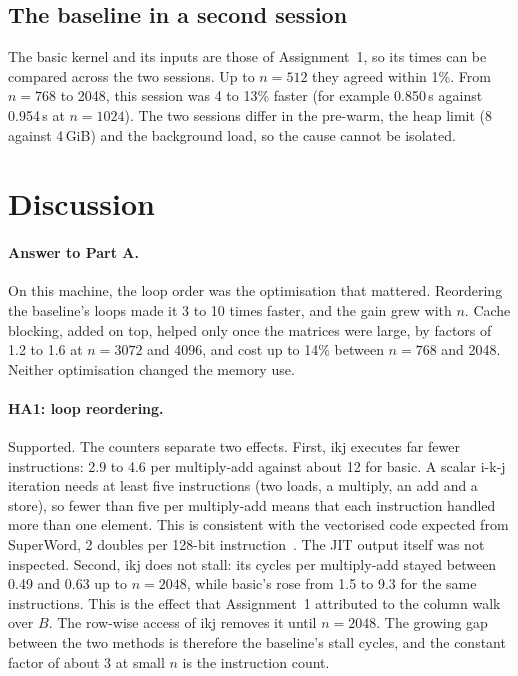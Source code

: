 \documentclass[11pt,a4paper]{article}
\begin{document}
\subsection{The baseline in a second session}

The basic kernel and its inputs are those of Assignment~1, so its times can be
compared across the two sessions. Up to $n=512$ they agreed within 1\%. From
$n=768$ to 2048, this session was 4 to 13\% faster (for example 0.850\,s
against 0.954\,s at $n=1024$). The two sessions differ in the pre-warm, the heap
limit (8 against 4\,GiB) and the background load, so the cause cannot be
isolated.

\section{Discussion}
\label{sec:discussion}

\paragraph{Answer to Part A.} On this machine, the loop order was the
optimisation that mattered. Reordering the baseline's loops made it 3 to 10
times faster, and the gain grew with $n$. Cache blocking, added on top, helped
only once the matrices were large, by factors of 1.2 to 1.6 at $n=3072$ and
4096, and cost up to 14\% between $n=768$ and 2048. Neither optimisation
changed the memory use.

\paragraph{HA1: loop reordering.} Supported. The counters separate two effects.
First, ikj executes far fewer instructions: 2.9 to 4.6 per multiply-add against
about 12 for basic. A scalar i-k-j iteration needs at least five instructions (two
loads, a multiply, an add and a store), so fewer than five per multiply-add
means that each instruction handled more than one element. This is consistent
with the vectorised code expected from SuperWord, 2 doubles per 128-bit
instruction~\cite{larsen2000}. The JIT output itself was not inspected. Second, ikj does not stall: its
cycles per multiply-add stayed between 0.49 and 0.63 up to $n=2048$, while
basic's rose from 1.5 to 9.3 for the same instructions. This is the effect that Assignment~1
attributed to the column walk over $B$. The row-wise access of ikj removes it
until $n=2048$. The growing gap between the two methods is therefore the
baseline's stall cycles, and the constant factor of about 3 at small $n$ is the
instruction count.
\end{document}
